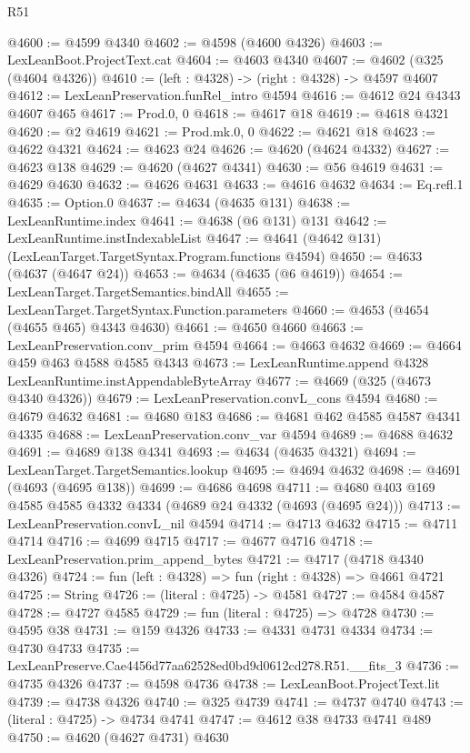 \begin{lexlean}{R51}
\begin{coremodule}
@4600 := @4599 @4340
@4602 := @4598 (@4600 @4326)
@4603 := LexLeanBoot.ProjectText.cat
@4604 := @4603 @4340
@4607 := @4602 (@325 (@4604 @4326))
@4610 := (left : @4328) -> (right : @4328) -> @4597 @4607
@4612 := LexLeanPreservation.funRel_intro @4594
@4616 := @4612 @24 @4343 @4607 @465
@4617 := Prod.{0, 0}
@4618 := @4617 @18
@4619 := @4618 @4321
@4620 := @2 @4619
@4621 := Prod.mk.{0, 0}
@4622 := @4621 @18
@4623 := @4622 @4321
@4624 := @4623 @24
@4626 := @4620 (@4624 @4332)
@4627 := @4623 @138
@4629 := @4620 (@4627 @4341)
@4630 := @56 @4619
@4631 := @4629 @4630
@4632 := @4626 @4631
@4633 := @4616 @4632
@4634 := Eq.refl.{1}
@4635 := Option.{0}
@4637 := @4634 (@4635 @131)
@4638 := LexLeanRuntime.index
@4641 := @4638 (@6 @131) @131
@4642 := LexLeanRuntime.instIndexableList
@4647 := @4641 (@4642 @131) (LexLeanTarget.TargetSyntax.Program.functions @4594)
@4650 := @4633 (@4637 (@4647 @24))
@4653 := @4634 (@4635 (@6 @4619))
@4654 := LexLeanTarget.TargetSemantics.bindAll
@4655 := LexLeanTarget.TargetSyntax.Function.parameters
@4660 := @4653 (@4654 (@4655 @465) @4343 @4630)
@4661 := @4650 @4660
@4663 := LexLeanPreservation.conv_prim @4594
@4664 := @4663 @4632
@4669 := @4664 @459 @463 @4588 @4585 @4343
@4673 := LexLeanRuntime.append @4328 LexLeanRuntime.instAppendableByteArray
@4677 := @4669 (@325 (@4673 @4340 @4326))
@4679 := LexLeanPreservation.convL_cons @4594
@4680 := @4679 @4632
@4681 := @4680 @183
@4686 := @4681 @462 @4585 @4587 @4341 @4335
@4688 := LexLeanPreservation.conv_var @4594
@4689 := @4688 @4632
@4691 := @4689 @138 @4341
@4693 := @4634 (@4635 @4321)
@4694 := LexLeanTarget.TargetSemantics.lookup
@4695 := @4694 @4632
@4698 := @4691 (@4693 (@4695 @138))
@4699 := @4686 @4698
@4711 := @4680 @403 @169 @4585 @4585 @4332 @4334 (@4689 @24 @4332 (@4693 (@4695 @24)))
@4713 := LexLeanPreservation.convL_nil @4594
@4714 := @4713 @4632
@4715 := @4711 @4714
@4716 := @4699 @4715
@4717 := @4677 @4716
@4718 := LexLeanPreservation.prim_append_bytes
@4721 := @4717 (@4718 @4340 @4326)
@4724 := fun (left : @4328) => fun (right : @4328) => @4661 @4721
@4725 := String
@4726 := (literal : @4725) -> @4581
@4727 := @4584 @4587
@4728 := @4727 @4585
@4729 := fun (literal : @4725) => @4728
@4730 := @4595 @38
@4731 := @159 @4326
@4733 := @4331 @4731 @4334
@4734 := @4730 @4733
@4735 := LexLeanPreserve.Cae4456d77aa62528ed0bd9d0612cd278.R51.__fits_3
@4736 := @4735 @4326
@4737 := @4598 @4736
@4738 := LexLeanBoot.ProjectText.lit
@4739 := @4738 @4326
@4740 := @325 @4739
@4741 := @4737 @4740
@4743 := (literal : @4725) -> @4734 @4741
@4747 := @4612 @38 @4733 @4741 @489
@4750 := @4620 (@4627 @4731) @4630

\end{coremodule}
\end{lexlean}
